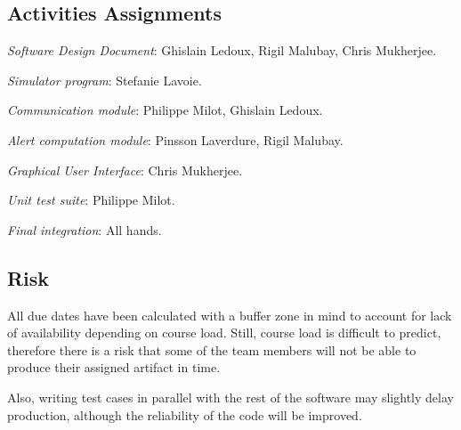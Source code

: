 \documentclass{article}
\begin{document}
\subsection{Activities Assignments}

\emph{Software Design Document}: Ghislain Ledoux, Rigil Malubay, Chris Mukherjee.

\emph{Simulator program}: Stefanie Lavoie.

\emph{Communication module}: Philippe Milot, Ghislain Ledoux.

\emph{Alert computation module}: Pinsson Laverdure, Rigil Malubay.

\emph{Graphical User Interface}: Chris Mukherjee.

\emph{Unit test suite}: Philippe Milot.

\emph{Final integration}: All hands.

\subsection{Risk}

All due dates have been calculated with a buffer zone in mind to account for lack of availability depending on course load. Still, course load is difficult to predict, therefore there is a risk that some of the team members will not be able to produce their assigned artifact in time. 

Also, writing test cases in parallel with the rest of the software may slightly delay production, although the reliability of the code will be improved.
\end{document}
